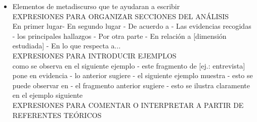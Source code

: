 \documentclass[a4paper,14pt]{article}
\begin{document}
\begin{itemize}
\begin{enumerate}
\begin{itemize}
%
\item Elementos de metadiscurso que te ayudaran a escribir\\
EXPRESIONES PARA ORGANIZAR SECCIONES DEL ANÁLISIS
\\En primer lugar- En segundo lugar - De acuerdo a - Las evidencias recogidas - los principales hallazgos - Por otra parte - En relación a [dimensión estudiada] - En lo que respecta a...\\
EXPRESIONES PARA INTRODUCIR EJEMPLOS\\
como se observa en el siguiente ejemplo - este fragmento de [ej.: entrevista] pone en evidencia - lo anterior sugiere - el siguiente ejemplo muestra - esto se puede observar en - el fragmento anterior sugiere - esto se ilustra claramente en el ejemplo siguiente\\
EXPRESIONES PARA COMENTAR O INTERPRETAR A PARTIR DE REFERENTES TEÓRICOS\\

\end{itemize}
\end{enumerate}
\end{itemize}
\end{document}

